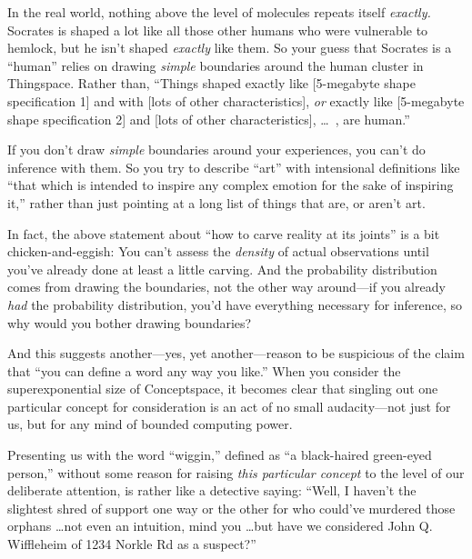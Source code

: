 {
 In the real world, nothing above the level of molecules repeats
itself \textit{exactly.} Socrates is shaped a lot like all those other
humans who were vulnerable to hemlock, but he isn't
shaped \textit{exactly} like them. So your guess that Socrates is a
``human'' relies on drawing
\textit{simple} boundaries around the human cluster in Thingspace.
Rather than, ``Things shaped exactly like [5-megabyte
shape specification 1] and with [lots of other characteristics],
\textit{or} exactly like [5-megabyte shape specification 2] and [lots
of other characteristics], \ldots~, are human.''}

{
 If you don't draw \textit{simple} boundaries
around your experiences, you can't do inference with
them. So you try to describe ``art''
with intensional definitions like ``that which is
intended to inspire any complex emotion for the sake of inspiring
it,'' rather than just pointing at a long list of
things that are, or aren't art.}

{
 In fact, the above statement about ``how to carve
reality at its joints'' is a bit chicken-and-eggish:
You can't assess the \textit{density} of actual
observations until you've already done at least a
little carving. And the probability distribution comes from drawing the
boundaries, not the other way around---if you already \textit{had} the
probability distribution, you'd have everything
necessary for inference, so why would you bother drawing boundaries?}

{
 And this suggests another---yes, yet another---reason to be
suspicious of the claim that ``you can define a word
any way you like.'' When you consider the
superexponential size of Conceptspace, it becomes clear that singling
out one particular concept for consideration is an act of no small
audacity---not just for us, but for any mind of bounded computing
power.}

{
 Presenting us with the word
``wiggin,'' defined as
``a black-haired green-eyed
person,'' without some reason for raising
\textit{this particular concept} to the level of our deliberate
attention, is rather like a detective saying: ``Well,
I haven't the slightest shred of support one way or the
other for who could've murdered those orphans \ldots not
even an intuition, mind you \ldots but have we considered John Q.
Wiffleheim of 1234 Norkle Rd as a suspect?''}

\myendsectiontext


\bigskip


